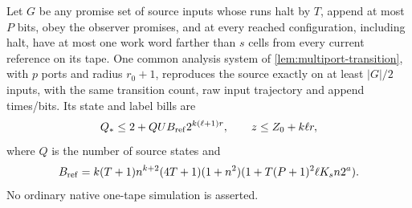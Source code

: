 \begin{theorem}\label{thm:reference-carrier}
\notformalized
Let $G$ be any promise set of source inputs whose runs halt by $T$, append
at most $P$ bits, obey the observer promises, and at every reached
configuration, including halt, have at most one work word farther than
$s$ cells from every current reference on its tape. One common analysis
system of \cref{lem:multiport-transition}, with $p$ ports and radius
$r_0+1$, reproduces the source exactly on at least $|G|/2$ inputs, with
the same transition count, raw input trajectory and append times/bits.
Its state and label bills are
\[
 Q_*\le2+QU B_{\rm ref}2^{k(\ell+1)r},\qquad
 z\le Z_0+k\ell r,
\]
where $Q$ is the number of source states and
\[
 B_{\rm ref}=k(T+1)n^{k+2}(4T+1)(1+n^2)
             (1+T(P+1)^2\ell K_s n2^a).
\]
No ordinary native one-tape simulation is asserted.
\end{theorem}
